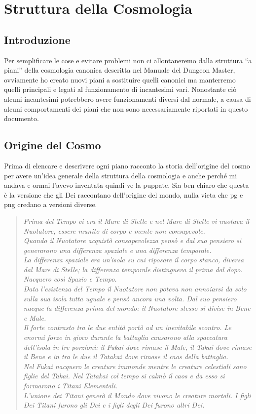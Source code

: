 \documentclass[10pt, a4paper]{report}
\begin{document}
\chapter{Struttura della Cosmologia}
\begin{multicols}{2}
\section{Introduzione}
 Per semplificare le cose e evitare problemi non ci allontaneremo dalla struttura \enquote{a piani} della cosmologia canonica descritta nel Manuale del Dungeon Master, ovviamente ho creato nuovi piani a sostituire quelli canonici ma manterremo quelli principali e legati al funzionamento di incantesimi vari. Nonostante ciò alcuni incantesimi potrebbero avere funzionamenti diversi dal normale, a causa di alcuni comportamenti dei piani che non sono necessariamente riportati in questo documento.
\section{Origine del Cosmo}
Prima di elencare e descrivere ogni piano racconto la storia dell'origine del cosmo per avere un'idea generale della struttura della cosmologia e anche perché mi andava e ormai l'avevo inventata quindi ve la puppate. Sia ben chiaro che questa è la versione che gli Dei raccontano dell'origine del mondo, nulla vieta che pg e png credano a versioni diverse. 
\\
\begin{verse}
\textit{Prima del Tempo vi era il Mare di Stelle e nel Mare di Stelle vi nuotava il Nuotatore, essere munito di corpo e mente non consapevole.\\
Quando il Nuotatore acquistò consapevolezza pensò e dal suo pensiero si generarono una differenza spaziale e una differenza temporale. \\
La differenza spaziale era un'isola su cui riposare il corpo stanco, diversa dal Mare di Stelle; la differenza temporale distingueva il prima dal dopo. Nacquero così Spazio e Tempo. \\
Data l'esistenza del Tempo il Nuotatore non poteva non annoiarsi da solo sulla sua isola tutta uguale e pensò ancora una volta. Dal suo pensiero nacque la differenza prima del mondo: il Nuotatore stesso si divise in Bene e Male. \\
Il forte contrasto tra le due entità portò ad un inevitabile scontro. Le enormi forze in gioco durante la battaglia causarono alla spaccatura dell'isola in tre porzioni: il Fukai dove rimase il Male, il Takai dove rimase il Bene e in tra le due il Tatakai dove rimase il caos della battaglia. \\
Nel Fukai nacquero le creature immonde mentre le creature celestiali sono figlie del Takai.
Nel Tatakai col tempo si calmò il caos e da esso si formarono i Titani Elementali.
\\ L'unione dei Titani generò il Mondo dove vivono le creature mortali. I figli Dei Titani furono gli Dei e i figli degli Dei furono altri Dei.}
\end{verse}
\vspace{0.5cm}

\end{multicols}
\end{document}

